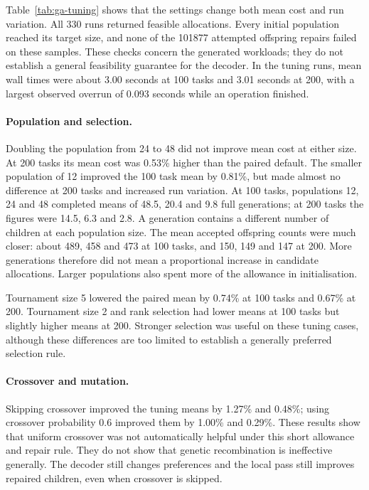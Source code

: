Table~\ref{tab:ga-tuning} shows that the settings change both mean cost and
run variation. All 330 runs returned feasible allocations. Every initial
population reached its target size, and none of the 101877 attempted offspring
repairs failed on these samples. These checks concern the generated workloads;
they do not establish a general feasibility guarantee for the decoder.
In the tuning runs, mean wall times were about 3.00 seconds at 100 tasks and 3.01 seconds at 200,
with a largest observed overrun of 0.093 seconds while an operation finished.



\paragraph{Population and selection.}
Doubling the population from 24 to 48 did not improve mean cost at either size.
At 200 tasks its mean cost was 0.53\% higher than the paired default.
The smaller population of 12 improved the 100 task mean by 0.81\%, but made
almost no difference at 200 tasks and increased run variation. At 100 tasks,
populations 12, 24 and 48 completed means of 48.5, 20.4 and 9.8 full
generations; at 200 tasks the figures were 14.5, 6.3 and 2.8. A generation
contains a different number of children at each population size. The mean
accepted offspring counts were much closer: about 489, 458 and 473 at
100 tasks, and 150, 149 and 147 at 200. More generations therefore did not
mean a proportional increase in candidate allocations. Larger populations
also spent more of the allowance in initialisation.

Tournament size 5 lowered the paired mean by 0.74\% at 100 tasks and 0.67\%
at 200. Tournament size 2 and rank selection had lower means at 100 tasks
but slightly higher means at 200. Stronger selection was useful on these
tuning cases, although these differences are too limited to establish a
generally preferred selection rule.

\paragraph{Crossover and mutation.}
Skipping crossover improved the tuning means by 1.27\% and 0.48\%; using
crossover probability 0.6 improved them by 1.00\% and 0.29\%. These results
show that uniform crossover was not automatically helpful under this short
allowance and repair rule. They do not show that genetic recombination is
ineffective generally. The decoder still changes preferences and the local
pass still improves repaired children, even when crossover is skipped.

